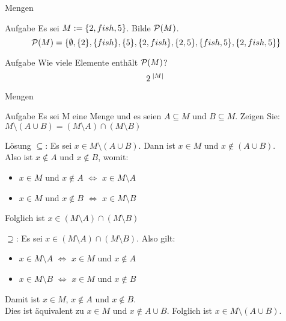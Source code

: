 	\begin{frame}{Mengen}
		\begin{exampleblock}{Aufgabe}
		Es sei $M := \{ 2,fish, 5 \}$. Bilde $\mathcal{P} (M)$. \\
		\pause
		$$\mathcal{P} (M) = \{ \emptyset, \{ 2 \}, \{ fish \}, \{ 5 \}, \{ 2,fish \}, \{ 2, 5 \}, \{ fish, 5 \}, \{ 2,fish, 5 \} \}$$
		\end{exampleblock}
		\pause
		\begin{exampleblock}{Aufgabe}
		Wie viele Elemente enthält $\mathcal{P} (M)$? \\
		\pause
		$$2^{\; \mid M \mid \;}$$
		\end{exampleblock}
	\end{frame}

	\begin{frame}{Mengen}
	\small{
		\begin{exampleblock}{Aufgabe}
			Es sei M eine Menge und es seien $A \subseteq M$ und $B \subseteq M$. Zeigen Sie: \\
			\centering $M \setminus (A \cup B) = (M \setminus A)  \cap (M \setminus B)$
		\end{exampleblock}
		}
	\pause 
	\tiny{
		\begin{block}{Lösung}
			$\subseteq$:
				Es sei $x \in M \setminus (A \cup B)$. Dann ist $x \in M$ und $x \notin (A \cup B)$.\\
				Also ist $x \notin A$ und $x \notin B$, womit:
				\begin{itemize}
					\itemsep0pt
					\item $x \in M$ und $x \notin A$ $\Longleftrightarrow $ $x \in M \setminus A$
					\item $x \in M$ und $x \notin B$ $\Longleftrightarrow$ $x \in M \setminus B$
				\end{itemize}
				Folglich ist $x \in (M \setminus A)  \cap (M \setminus B)$ \\

			\pause

			$\supseteq$:
				Es sei $x \in (M \setminus A) \cap (M \setminus B)$. Also gilt:
				\begin{itemize}
					\itemsep0pt
					\item $x \in M \setminus A$ $\Longleftrightarrow$ $x \in M$ und $x \notin A$
					\item $x \in M \setminus B$ $\Longleftrightarrow$ $x \in M$ und $x \notin B$
				\end{itemize}
				Damit ist $x \in M$, $x \notin A$ und $x \notin B$. \\
				Dies ist äquivalent zu $x \in M$ und $x \notin A \cup B$.
				Folglich ist $x \in M \setminus (A \cup B)$.

		\end{block}
		}
	\end{frame}

